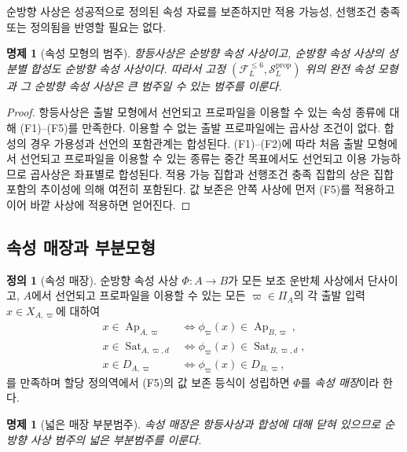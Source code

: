 \documentclass[11pt]{article}
\newcommand{\FVI}{\mathcal F_{L}^{\le 6}}
\newcommand{\Sprop}{\mathcal S_{L}^{\mathrm{prop}}}
\newcommand{\Ap}{\operatorname{Ap}}
\newcommand{\Sat}{\operatorname{Sat}}
\newtheorem{proposition}[theorem]{명제}
\theoremstyle{definition}
\newtheorem{definition}[theorem]{정의}
\theoremstyle{remark}
\begin{document}
순방향 사상은 성공적으로 정의된 속성 자료를 보존하지만 적용 가능성, 선행조건 충족 또는 정의됨을 반영할 필요는 없다.

\begin{proposition}[속성 모형의 범주]
항등사상은 순방향 속성 사상이고, 순방향 속성 사상의 성분별 합성도 순방향 속성 사상이다.
따라서 고정 \((\FVI,\Sprop)\) 위의 완전 속성 모형과 그 순방향 속성 사상은 큰 범주일 수 있는 범주를 이룬다.
\end{proposition}

\begin{proof}
항등사상은 출발 모형에서 선언되고 프로파일을 이용할 수 있는 속성 종류에 대해 (F1)--(F5)를 만족한다.
이용할 수 없는 출발 프로파일에는 곱사상 조건이 없다.
합성의 경우 가용성과 선언의 포함관계는 합성된다.
(F1)--(F2)에 따라 처음 출발 모형에서 선언되고 프로파일을 이용할 수 있는 종류는 중간 목표에서도 선언되고 이용 가능하므로 곱사상은 좌표별로 합성된다.
적용 가능 집합과 선행조건 충족 집합의 상은 집합 포함의 추이성에 의해 여전히 포함된다.
값 보존은 안쪽 사상에 먼저 (F5)를 적용하고 이어 바깥 사상에 적용하면 얻어진다.
\end{proof}

\subsection{속성 매장과 부분모형}

\begin{definition}[속성 매장]
순방향 속성 사상 \(\Phi:A\to B\)가 모든 보조 운반체 사상에서 단사이고, \(A\)에서 선언되고 프로파일을 이용할 수 있는 모든 \(\varpi\in\Pi_A\)의 각 출발 입력 \(x\in X_{A,\varpi}\)에 대하여
\[
\begin{aligned}
x\in\Ap_{A,\varpi}
&\Longleftrightarrow
\phi_{\varpi}(x)\in\Ap_{B,\varpi},\\
x\in\Sat_{A,\varpi,d}
&\Longleftrightarrow
\phi_{\varpi}(x)\in\Sat_{B,\varpi,d},\\
x\in D_{A,\varpi}
&\Longleftrightarrow
\phi_{\varpi}(x)\in D_{B,\varpi},
\end{aligned}
\]
를 만족하며 할당 정의역에서 (F5)의 값 보존 등식이 성립하면 \(\Phi\)를 \emph{속성 매장}이라 한다.
\end{definition}

\begin{proposition}[넓은 매장 부분범주]
속성 매장은 항등사상과 합성에 대해 닫혀 있으므로 순방향 사상 범주의 넓은 부분범주를 이룬다.
\end{proposition}
\end{document}

